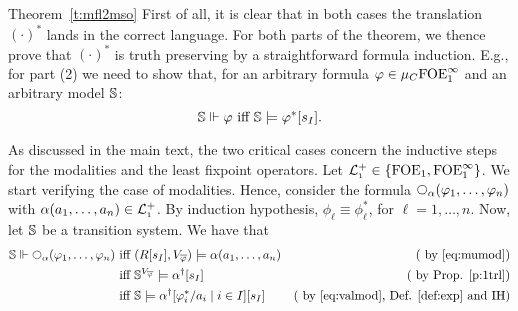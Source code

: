 \begin{proofof}{Theorem~\ref{t:mfl2mso}}
First of all, it is clear that in both cases the translation $(\cdot)^{*}$ lands 
in the correct language.
For both parts of the theorem, we thence prove that $(\cdot)^{*}$ is truth
preserving by a straightforward formula induction.
E.g., for part (2) we need to show that, for an arbitrary formula $\varphi\in
\mu_{C}\mathrm{FOE}^{\infty}_1$ and an arbitrary model $\mathbb{S}$:
\begin{equation}
\label{eq:xxxx1}
\model \mmodels \phi \text{ iff } \model \models \phi^{*}[s_{I}].
\end{equation}

As discussed in the main text, the two critical cases concern the inductive 
steps for the modalities and the least fixpoint operators. 
Let $ \mathcal{L}_{\scriptscriptstyle 1}^{+} \in \{\mathrm{FOE}_1,\mathrm{FOE}^{\infty}_1\}$.
We start verifying the case of modalities. 
Hence, consider the formula $\nxt{\al}(\varphi_{1},\ldots,\varphi_{n})$ with 
$\alpha(a_{1},\ldots,a_{n}) \in \mathcal{L}_{\scriptscriptstyle 1}^{+}$. 
By induction hypothesis, $\phi_\ell \equiv \phi^{*}_\ell$, for $\ell=1,\dots, n$.
Now, let $\mathbb{S}$ be a transition system. We have that
\begin{align*}
\model \mmodels \nxt{\al}(\varphi_{1},\ldots,\varphi_{n}) \text{ iff } 
  & (R[s_{I}],V_{\overline{\varphi}}) \models \al(a_{1},\ldots,a_{n})  
  & \text{( by \eqref{eq:mumod})}
\\ \text{ iff } 
  & \model^{V_{\overline{\varphi}}} \models \al^{\dag}[s_{I}] 
  & \text{( by Prop. \ref{p:1trl})}
\\ \text{ iff } 
  & \model \models \al^{\dag}[\phi_{i}^{*}/a_{i} \mid i \in I][s_{I}] 
  & \text{( by \eqref{eq:valmod}, Def. \ref{def:exp} and IH)}
\end{align*}


\end{proofof}
